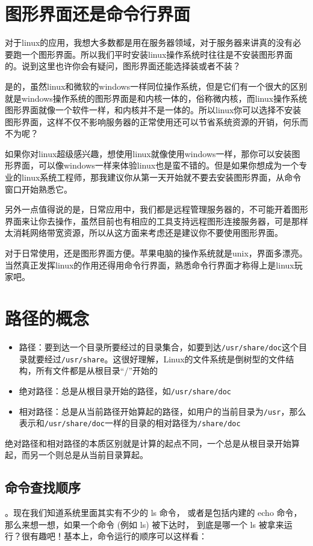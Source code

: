 \section{图形界面还是命令行界面}
 对于linux的应用，我想大多数都是用在服务器领域，对于服务器来讲真的没有必要跑一个图形界面。所以我们平时安装linux操作系统时往往是不安装图形界面的。说到这里也许你会有疑问，图形界面还能选择装或者不装？

是的，虽然linux和微软的windows一样同位操作系统，但是它们有一个很大的区别就是windows操作系统的图形界面是和内核一体的，俗称微内核，而linux操作系统图形界面就像一个软件一样，和内核并不是一体的。所以linux你可以选择不安装图形界面，这样不仅不影响服务器的正常使用还可以节省系统资源的开销，何乐而不为呢？

如果你对linux超级感兴趣，想使用linux就像使用windows一样，那你可以安装图形界面，可以像windows一样来体验linux也是蛮不错的。但是如果你想成为一个专业的linux系统工程师，那我建议你从第一天开始就不要去安装图形界面，从命令窗口开始熟悉它。

另外一点值得说的是，日常应用中，我们都是远程管理服务器的，不可能开着图形界面来让你去操作，虽然目前也有相应的工具支持远程图形连接服务器，可是那样太消耗网络带宽资源，所以从这方面来考虑还是建议你不要使用图形界面。

对于日常使用，还是图形界面方便。苹果电脑的操作系统就是unix，界面多漂亮。当然真正发挥linux的作用还得用命令行界面，熟悉命令行界面才称得上是linux玩家吧。


\section{路径的概念}
\begin{itemize}
\item 路径：要到达一个目录所要经过的目录集合，如要到达\verb|/usr/share/doc|这个目录就要经过\verb|/usr/share|。这很好理解，Linux的文件系统是倒树型的文件结构，所有文件都是从根目录“/”开始的

\item 绝对路径：总是从根目录开始的路径，如\verb|/usr/share/doc|

\item 相对路径：总是从当前路径开始算起的路径，如用户的当前目录为\verb|/usr|，那么表示和\verb|/usr/share/doc|一样的目录的相对路径为\verb|/share/doc|
\end{itemize}

绝对路径和相对路径的本质区别就是计算的起点不同，一个总是从根目录开始算起，而另一个则总是从当前目录算起。


\subsection{命令查找顺序}
。现在我们知道系统里面其实有不少的 ls 命令， 或者是包括内建的 echo 命令，那么来想一想，如果一个命令 (例如 ls) 被下达时， 到底是哪一个 ls 被拿来运行？很有趣吧！基本上，命令运行的顺序可以这样看：

